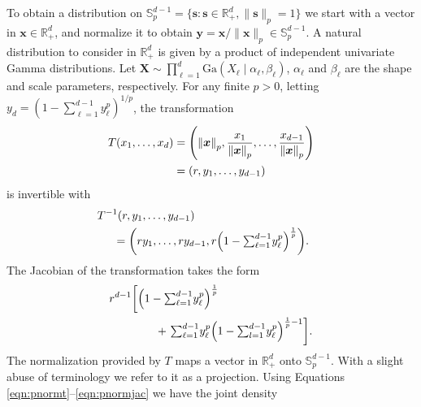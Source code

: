 To obtain a distribution on 
${\mathbb S}_{p}^{d-1}=\{\bm{s} : \bm{s} \in {\mathbb R}_{+}^{d}, \| \bm{s}\|_{p} = 1\}$ 
we start with a vector in 
$\bm{x} \in {\mathbb R}^d_+$, and normalize it to obtain 
$\bm{y} = \bm{x}/\|\bm{x}\|_p \in {\mathbb S}_p^{d-1}$. 
A natural  distribution to consider in ${\mathbb R}^d_+$ is given by a product of independent
  univariate Gamma distributions. Let
    $\bm{ X} \sim \prod_{\ell = 1}^d\text{Ga}\left(X_{\ell}\mid\alpha_{\ell},\beta_{\ell}\right)$, 
    $\alpha_\ell$ and $\beta_\ell$ are the shape and scale parameters, respectively. 
    For any finite $p>0$, letting 
   $ y_d = (1 - {\textstyle\sum}_{\ell = 1}^{d-1}y_{\ell}^p)^{1/p}$,
    the transformation
  \begin{equation}
    \label{eqn:pnormt}
    \begin{aligned}
    T(x_1,\ldots,x_d) &= \left(\pnorm{\bm{x}}{p}, \frac{x_1}{\pnorm{\bm{x}}{p}},
                          \ldots , \frac{x_{d-1}}{\pnorm{\bm{x}}{p}}\right) \\
                        &= (r,y_1,\ldots,y_{d-1})
    \end{aligned}
  \end{equation}
  is invertible with
  \begin{equation}
    \label{eqn:pnormtinv}
    \begin{aligned}
    &\hspace{-0.5cm}T^{-1}\left(r,y_1,\ldots,y_{d-1}\right)\\
      & = \left(ry_1,\ldots,ry_{d-1}, 
        r\left(1 - {\textstyle\sum}_{\ell = 1}^{d-1}y_{\ell}^p\right)^{\frac{1}{p}}\right).
    \end{aligned}
  \end{equation}
  The Jacobian of the transformation takes the form
  \begin{equation}
    \label{eqn:pnormjac}
    \begin{aligned}
    r^{d-1}\left[\left(1 - {\textstyle\sum}_{\ell = 1}^{d-1}y_{\ell}^p\right)^{\frac{1}{p}} \right. & \\
        &\hspace{-2cm}+ \left. {\textstyle\sum}_{\ell = 1}^{d-1}y_{\ell}^p
          \left(1 - {\textstyle\sum}_{l=1}^{d-1} y_{\ell}^p\right)^{\frac{1}{p} - 1}\right].
    \end{aligned}
  \end{equation}
  The normalization provided by $T$ maps a vector in ${\mathbb R}_+^d$ onto
  ${\mathbb S}_p^{d-1} $. With a slight abuse of terminology we refer to it as a
  projection. Using Equations \eqref{eqn:pnormt}--\eqref{eqn:pnormjac} we have the joint density
